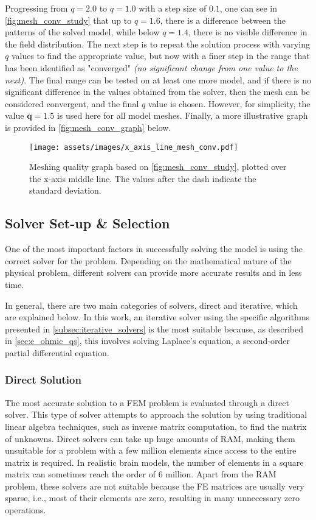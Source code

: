 Progressing from $q=2.0$ to $q=1.0$ with a step size of $0.1$, one can see in \autoref{fig:mesh_conv_study} that up to $q=1.6$, there is a difference between the patterns of the solved model, while below $q=1.4$, there is no visible difference in the field distribution. The next step is to repeat the solution process with varying $q$ values to find the appropriate value, but now with a finer step in the range that has been identified as "converged" \textit{(no significant change from one value to the next)}. The final range can be tested on at least one more model, and if there is no significant difference in the values obtained from the solver, then the mesh can be considered convergent, and the final $q$ value is chosen. However, for simplicity, the value $\boldsymbol{q=1.5}$ is used here for all model meshes. Finally, a more illustrative graph is provided in \autoref{fig:mesh_conv_graph} below.

\begin{figure}[H]
    \centering
    \texttt{[image: assets/images/x\_axis\_line\_mesh\_conv.pdf]}
    \caption{Meshing quality graph based on \autoref{fig:mesh_conv_study}, plotted over the x-axis middle line. The values after the dash indicate the standard deviation.}
    \label{fig:mesh_conv_graph}
\end{figure}

\subsection{Solver Set-up \& Selection}

One of the most important factors in successfully solving the model is using the correct solver for the problem. Depending on the mathematical nature of the physical problem, different solvers can provide more accurate results and in less time.

In general, there are two main categories of solvers, direct and iterative, which are explained below. In this work, an iterative solver using the specific algorithms presented in \ref{subsec:iterative_solvers} is the most suitable because, as described in \ref{sec:e_ohmic_qs}, this involves solving Laplace's equation, a second-order partial differential equation.

\subsubsection{Direct Solution}

The most accurate solution to a \gls{FEM} problem is evaluated through a direct solver. This type of solver attempts to approach the solution by using traditional linear algebra techniques, such as inverse matrix computation, to find the matrix of unknowns. Direct solvers can take up huge amounts of \gls{RAM}, making them unsuitable for a problem with a few million elements since access to the entire matrix is required. In realistic brain models, the number of elements in a square matrix can sometimes reach the order of 6 million. Apart from the \gls{RAM} problem, these solvers are not suitable because the \gls{FE} matrices are usually very sparse, i.e., most of their elements are zero, resulting in many unnecessary zero operations.

